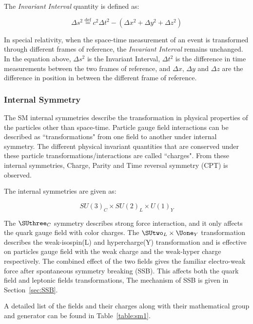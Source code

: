     The \textit{Invariant Interval} quantity is defined as:

    \begin{equation}
        \Delta s^2 \overset{\mathrm{def}}{=} c^{2}\Delta t^{2} - (\Delta x^{2}+\Delta y^{2} + \Delta z^{2})
        \label{eq:InvariantInterval}
    \end{equation}

    In special relativity, when the space-time measurement of an event is transformed through different frames of reference, the \textit{Invariant Interval} remains unchanged. In the equation above, $\Delta s^{2}$ is the Invariant Interval, $\Delta t^{2}$ is the difference in time measurements between the two frames of reference, and $\Delta x$, $\Delta y$ and $\Delta z$ are the difference in position in between the different frame of reference.

\subsubsection{Internal Symmetry}
The SM internal symmetries describe the transformation in physical properties of the particles other than space-time. Particle gauge field interactions can be described as ``transformations" from one field to another under internal symmetry. The different physical invariant quantities that are conserved under these particle transformations/interactions are called ``charges". From these internal symmetries, Charge, Parity and Time reversal symmetry (CPT) is observed. 

The internal symmetries are given as:

\begin{equation}
    SU(3)_{C} \times SU(2)_{L} \times U(1)_{Y}
\end{equation}


    

    The $\SUthree_{C}$ symmetry describes strong force interaction, and it only affects the quark gauge field with color charges. The $\SUtwo_{L} \times \Uone_{Y}$ transformation describes the weak-isospin(L) and hypercharge(Y) transformation and is effective on particles gauge field with the weak charge and the weak-hyper charge respectively. The combined effect of the two fields gives the familiar electro-weak force after spontaneous symmetry breaking (SSB). This affects both the quark field and leptonic fields transformations, The mechanism of SSB is given in Section~\ref{sec:SSB}.

    A detailed list of the fields and their charges along with their mathematical group and generator can be found in Table~\ref{table:sm1}.

